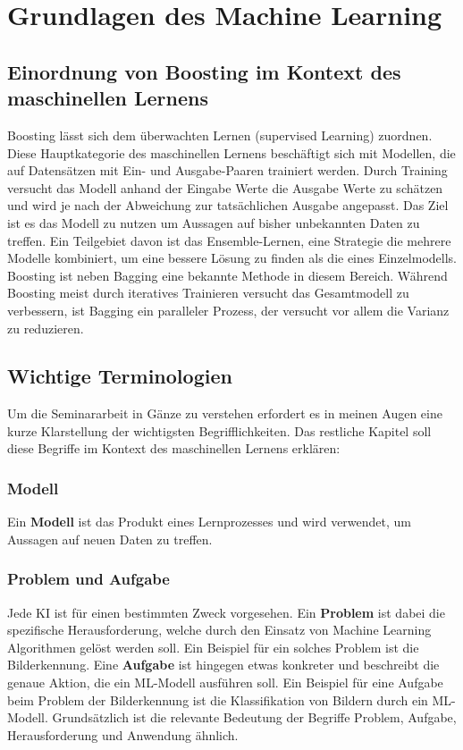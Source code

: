 \section{Grundlagen des Machine Learning}
\subsection{Einordnung von Boosting im Kontext des maschinellen Lernens}
Boosting lässt sich dem überwachten Lernen (supervised Learning) zuordnen. Diese Hauptkategorie des maschinellen Lernens beschäftigt sich mit Modellen, die auf Datensätzen mit Ein- und Ausgabe-Paaren trainiert werden. Durch Training versucht das Modell anhand der Eingabe Werte die Ausgabe Werte zu schätzen und wird je nach der Abweichung zur tatsächlichen Ausgabe angepasst. Das Ziel ist es das Modell zu nutzen um Aussagen auf bisher unbekannten Daten zu treffen.
\newline
Ein Teilgebiet davon ist das Ensemble-Lernen, eine Strategie die mehrere Modelle kombiniert, um eine bessere Lösung zu finden als die eines Einzelmodells. Boosting ist neben Bagging eine bekannte Methode in diesem Bereich. Während Boosting meist durch iteratives Trainieren versucht das Gesamtmodell zu verbessern, ist Bagging ein paralleler Prozess, der versucht vor allem die Varianz zu reduzieren.

\subsection{Wichtige Terminologien}
Um die Seminararbeit in Gänze zu verstehen erfordert es in meinen Augen eine kurze Klarstellung der wichtigsten Begrifflichkeiten. Das restliche Kapitel soll diese Begriffe im Kontext des maschinellen Lernens erklären:

\subsubsection{Modell}
Ein \textbf{Modell} ist das Produkt eines Lernprozesses und wird verwendet, um Aussagen auf neuen Daten zu treffen.

\subsubsection{Problem und Aufgabe}
Jede KI ist für einen bestimmten Zweck vorgesehen. Ein \textbf{Problem} ist dabei die spezifische Herausforderung, welche durch den Einsatz von Machine Learning Algorithmen gelöst werden soll. Ein Beispiel für ein solches Problem ist  die Bilderkennung. Eine \textbf{Aufgabe} ist hingegen etwas konkreter und beschreibt die genaue Aktion, die ein ML-Modell ausführen soll. Ein Beispiel für eine Aufgabe beim Problem der Bilderkennung ist die Klassifikation von Bildern durch ein ML-Modell. Grundsätzlich ist die relevante Bedeutung der Begriffe Problem, Aufgabe, Herausforderung und Anwendung ähnlich.

